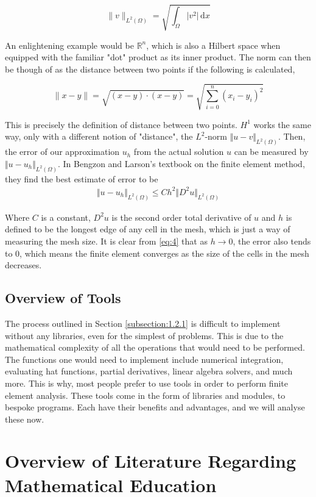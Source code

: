 $$
\lVert v \rVert_{L^2(\Omega)} = \sqrt{\int_{\Omega} \lvert v^2 \rvert \, \mathrm{d}x} 
$$

An enlightening example would be $\mathbb{R}^n$, which is also a Hilbert space when equipped with the familiar "dot" product as its inner product. The norm can then be though of as the distance between two points if the following is calculated,

$$\lVert x - y \rVert = \sqrt{(x-y) \cdot (x-y)} = \sqrt{\sum_{i=0}^n (x_i-y_i)^2}$$

This is precisely the definition of distance between two points. $H^1$ works the same way, only with a different notion of "distance", the $L^2$-norm $\Vert u - v \Vert_{L^2(\Omega)}$. Then, the error of our approximation $u_h$ from the actual solution $u$ can be measured by $\Vert u - u_h \Vert_{L^2(\Omega)}$.
In Bengzon and Larson's textbook on the finite element method\cite{bengzon-larson-fem}, they find the best estimate of error to be 
\begin{align}
\Vert u - u_h \Vert_{L^2(\Omega)} \leq Ch^2\Vert D^2 u \Vert_{L^2(\Omega)} \label{eq:4}
\end{align}

Where $C$ is a constant, $D^2u$ is the second order total derivative of $u$ and $h$ is defined to be the longest edge of any cell in the mesh, which is just a way of measuring the mesh size. It is clear from \ref{eq:4} that as $h \rightarrow 0$, the error also tends to $0$, which means the finite element converges as the size of the cells in the mesh decreases.

\subsection{Overview of Tools}

The process outlined in Section \ref{subsection:1.2.1} is difficult to implement without any libraries, even for the simplest of problems. This is due to the mathematical complexity of all the operations that would need to be performed. The functions one would need to implement include numerical integration, evaluating hat functions, partial derivatives, linear algebra solvers, and much more. This is why, most people prefer to use tools in order to perform finite element analysis. These tools come in the form of libraries and modules, to bespoke programs. Each have their benefits and advantages, and we will analyse these now.

\section{Overview of Literature Regarding Mathematical Education}

